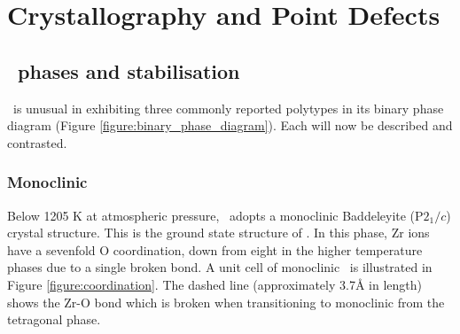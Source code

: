 \chapter{Crystallography and Point Defects}

\label{ch:crystallography}

\section{\zirconia\ phases and stabilisation}

\zirconia\ is unusual in exhibiting three commonly reported polytypes in its binary phase diagram (Figure \ref{figure:binary_phase_diagram}). Each will now be described and contrasted.



\subsection{Monoclinic}

Below 1205 K at atmospheric pressure, \zirconia\ adopts a monoclinic Baddeleyite (P$2_{1}/c$) crystal structure. This is the ground state structure of \zirconia . In this phase, Zr ions have a sevenfold O coordination, down from eight in the higher temperature phases due to a single broken bond. A unit cell of monoclinic \zirconia\ is illustrated in Figure \ref{figure:coordination}. The dashed line (approximately 3.7\r{A} in length) shows the Zr-O bond which is broken when transitioning to monoclinic from the tetragonal phase.

